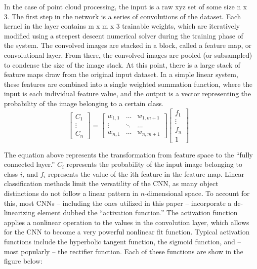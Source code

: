 \documentclass[12pt]{drexelthesis}
\begin{document}
In the case of point cloud processing, the input is a raw xyz set of some size n x 3. The first step in the network is a series of convolutions of the dataset. Each kernel in the layer contains m x m x 3 trainable weights, which are iteratively modified using a steepest descent numerical solver during the training phase of the system. The convolved images are stacked in a block, called a feature map, or convolutional layer. From there, the convolved images are pooled (or subsampled) to condense the size of the image stack. 
At this point, there is a large stack of feature maps draw from the original input dataset. In a simple linear system, these features are combined into a single weighted summation function, where the input is each individual feature value, and the output is a vector representing the probability of the image belonging to a certain class.
\[
\begin{bmatrix}
C_{1} \\
\vdots \\
C_{n}
\end{bmatrix}  =  \begin{bmatrix} w_{1,1} & \hdots & w_{1,m+1} \\ \vdots & \ddots & \hdots \\ w_{n,1} & \hdots & w_{n, m+1} \end{bmatrix}  \begin{bmatrix} f_{1} \\ \vdots \\ f_{n} \\ 1 \end{bmatrix} \]

The equation above represents the transformation from feature space to the “fully connected layer.” $C_{i}$ represents the probability of the input image belonging to class $i$, and $f_{i}$ represents the value of the ith feature in the feature map. 
Linear classification methods limit the versatility of the CNN, as many object distinctions do not follow a linear pattern in $n$-dimensional space. To account for this, most CNNs – including the ones utilized in this paper – incorporate a de-linearizing element dubbed the “activation function.” The activation function applies a nonlinear operation to the values in the convolution layer, which allows for the CNN to become a very powerful nonlinear fit function. Typical activation functions include the hyperbolic tangent function, the sigmoid function, and – most popularly – the rectifier function. Each of these functions are show in the figure below:
\end{document}
